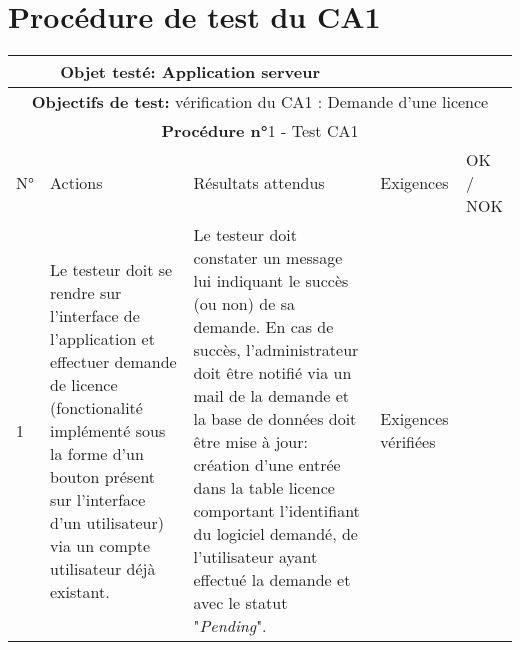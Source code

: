 \section*{Procédure de test du CA1}
\begin{table}[!h]
        \centering
        \begin{tabular}{|m{0.6cm}|
                         >{\raggedright\arraybackslash}m{4cm}|
                         >{\raggedright\arraybackslash}m{6.4cm}|
                         >{\raggedright\arraybackslash}m{2cm}|
                         m{1cm}|}
            \hline
            \multicolumn{3}{|c|}{
                \textbf{Objet testé: } Application serveur 
            } & \multicolumn{2}{|c|}{
                \textbf{Version: } version    
            } \\
            \hline
            \multicolumn{5}{|c|}{\textbf{Objectifs de test:} 
                vérification du CA1 : Demande d'une licence} \\
            \hline
            \multicolumn{5}{|c|}{
                \textbf{Procédure n°}1 - Test CA1
            } \\
            \hline
            N° & Actions & Résultats attendus & Exigences & OK / NOK \\
            \hline      %
            1 & Le testeur doit se rendre sur l'interface de l'application et 
                effectuer demande de licence (fonctionalité implémenté 
                sous la forme d'un bouton présent sur l'interface d'un
                utilisateur) via un compte utilisateur déjà existant. 
              & Le testeur doit constater un message lui indiquant le succès (ou non)
                de sa demande. En cas de succès, l'administrateur doit être notifié via 
                un mail de la demande et la base de données doit être mise à jour: 
                création d'une entrée dans la table licence comportant l'identifiant du
                logiciel demandé, de l'utilisateur ayant effectué la demande et avec le 
                statut "\emph{Pending}".
              & Exigences vérifiées & \\
            \hline
        \end{tabular} 
        \label{tab:tab1}
\end{table}
\newpage

